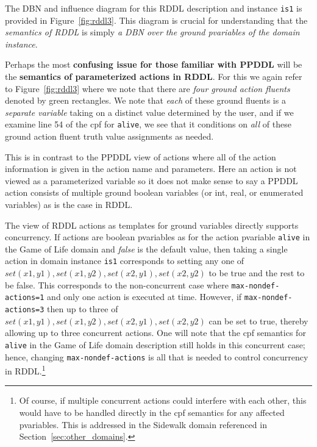 \documentclass[11pt,a4paper]{article}
\begin{document}
The DBN and influence diagram for this RDDL description and instance
\texttt{is1} is provided in Figure~\ref{fig:rddl3}.  This diagram is
crucial for understanding that the \emph{semantics of RDDL} is simply
\emph{a DBN over the ground pvariables of the domain instance}.

Perhaps the most {\bf confusing issue for those familiar with PPDDL}
will be the {\bf semantics of parameterized actions in RDDL}.  For
this we again refer to Figure~\ref{fig:rddl3} where we note that there
are \emph{four ground action fluents} denoted by green rectangles.  We
note that \emph{each} of these ground fluents is a \emph{separate
variable} taking on a distinct value determined by the user, and if we
examine line 54 of the cpf for \texttt{alive}, we see that it
conditions on \emph{all} of these ground action fluent truth value 
assignments as needed.

This is in contrast to the PPDDL view of actions where all of the
action information is given in the action name and parameters.  Here
an action is not viewed as a parameterized variable so it
does not make sense to say a PPDDL action consists of multiple
ground boolean variables (or
int, real, or enumerated variables) as is the case in RDDL.

The view of RDDL actions as templates for ground variables directly
supports concurrency.  If actions are boolean pvariables as for the
action pvariable \texttt{alive} in the Game of Life domain and {\it
false} is the default value, then taking a single action in domain
instance \texttt{is1} corresponds to setting any one of
$\mathit{set}(x1,y1), \mathit{set}(x1,y2), \mathit{set}(x2,y1),
\mathit{set}(x2,y2)$ to be true and the rest to be false.  This
corresponds to the non-concurrent case where
\texttt{max-nondef-actions=1} and only one action is executed at time.
However, if \texttt{max-nondef-actions=3} then up to three of
$\mathit{set}(x1,y1), \mathit{set}(x1,y2), \mathit{set}(x2,y1),
\mathit{set}(x2,y2)$ can be set to true, thereby allowing up to three
concurrent actions.  One will note that the cpf semantics for
\texttt{alive} in the Game of Life domain description still holds in
this concurrent case; hence, changing \texttt{max-nondef-actions} is
all that is needed to control concurrency in RDDL.\footnote{Of course,
if multiple concurrent actions could interfere with each other, this
would have to be handled directly in the cpf semantics for any
affected pvariables.  This is addressed in the Sidewalk domain
referenced in Section~\ref{sec:other_domains}.}
\end{document}

